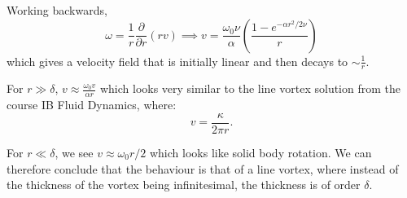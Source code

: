 \documentclass[../Main.tex]{subfiles}
\begin{document}
\begin{example}
    Working backwards,
    \begin{equation*}
        \omega = \frac1r \frac{\partial }{\partial r} (rv) \implies v = \frac{\omega_0 \nu}{\alpha} \left(\frac{1 - e^{-\alpha r^2 / 2\nu}}{r}\right)
    \end{equation*}
    which gives a velocity field that is initially linear and then decays to $\sim \frac1r$.

    For $r \gg \delta$, $v \approx \frac{\omega_0 v}{\alpha r}$ which looks very similar to the line vortex solution from the course IB Fluid Dynamics, where:
    \begin{equation*}
        v = \frac{\kappa}{2\pi r}.
    \end{equation*}

    For $r \ll \delta$, we see $v \approx \omega_0 r / 2$ which looks like solid body rotation. We can therefore conclude that the behaviour is that of a line vortex, where instead of the thickness of the vortex being infinitesimal, the thickness is of order $\delta$.
\end{example}
\end{document}
